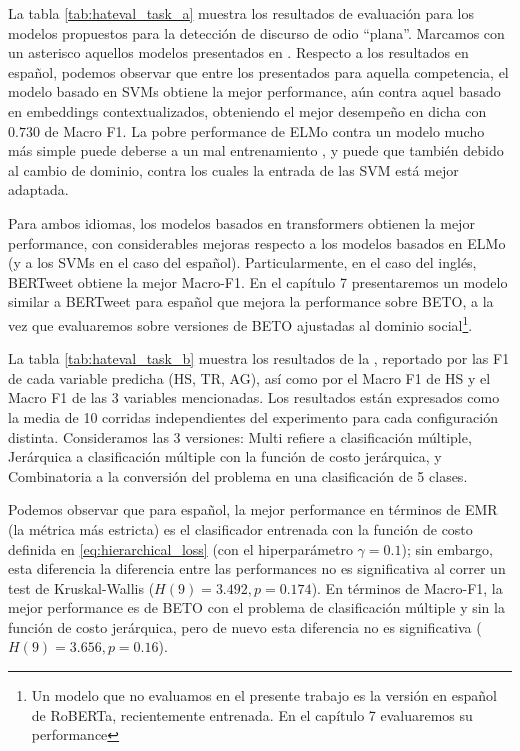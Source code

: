 La tabla \ref{tab:hateval_task_a} muestra los resultados de evaluación para los modelos propuestos para la detección de discurso de odio ``plana''. Marcamos con un asterisco aquellos modelos presentados en \citet{atalaya_tass2018}. Respecto a los resultados en español, podemos observar que entre los presentados para aquella competencia, el modelo basado en SVMs obtiene la mejor performance, aún contra aquel basado en embeddings contextualizados, obteniendo el mejor desempeño en dicha con $0.730$ de Macro F1. La pobre performance de ELMo contra un modelo mucho más simple puede deberse a un mal entrenamiento , y puede que también debido al cambio de dominio, contra los cuales la entrada de las SVM está mejor adaptada.

Para ambos idiomas, los modelos basados en transformers \cite{vaswani2017attention} obtienen la mejor performance, con considerables mejoras respecto a los modelos basados en ELMo (y a los SVMs en el caso del español). Particularmente, en el caso del inglés, BERTweet \cite{bertweet} obtiene la mejor Macro-F1. En el capítulo 7 presentaremos un modelo similar a BERTweet para español que mejora la performance sobre BETO, a la vez que evaluaremos sobre versiones de BETO ajustadas al dominio social\footnote{Un modelo que no evaluamos en el presente trabajo es la versión en español de RoBERTa, recientemente entrenada. En el capítulo 7 evaluaremos su performance}.

La tabla \ref{tab:hateval_task_b} muestra los resultados de la \subtaskb{}, reportado por las F1 de cada variable predicha (HS, TR, AG), así como por el Macro F1 de HS y el Macro F1 de las 3 variables mencionadas. Los resultados están expresados como la media de 10 corridas independientes del experimento para cada configuración distinta. Consideramos las 3 versiones: Multi refiere a clasificación múltiple, Jerárquica a clasificación múltiple con la función de costo jerárquica, y Combinatoria a la conversión del problema en una clasificación de 5 clases.

Podemos observar que para español, la mejor performance en términos de EMR (la métrica más estricta) es el clasificador entrenada con la función de costo definida en \ref{eq:hierarchical_loss} (con el hiperparámetro $\gamma = 0.1$); sin embargo, esta diferencia la diferencia entre las performances no es significativa al correr un test de Kruskal-Wallis ($H(9) = 3.492, p = 0.174$). En términos de Macro-F1, la mejor performance es de BETO con el problema de clasificación múltiple y sin la función de costo jerárquica, pero de nuevo esta diferencia no es significativa ($H(9) = 3.656, p=0.16$).

